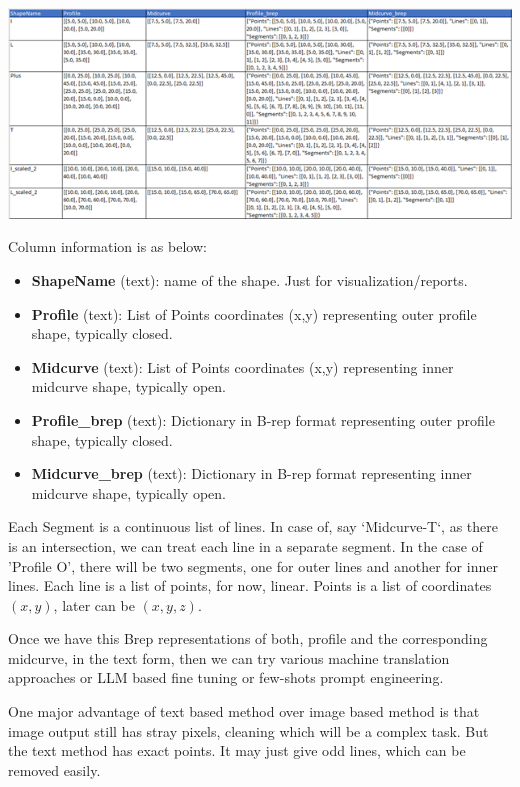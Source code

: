 \documentclass[10pt, conference]{IEEEtran}
\begin{document}
         \begin{center}
	\includegraphics[width=\linewidth]{images/shapes_csv}
	\label{fig_csv}
    \end{center}

Column information is as below:
	\begin{itemize}
	\item {\bf ShapeName} (text): name of the shape. Just for visualization/reports.
	\item {\bf Profile} (text): List of Points coordinates (x,y) representing outer profile shape, typically closed.
	\item {\bf Midcurve} (text): List of Points coordinates (x,y) representing inner midcurve shape, typically open.
	\item {\bf Profile\_brep} (text): Dictionary in B-rep format representing outer profile shape, typically closed.
	\item {\bf Midcurve\_brep} (text): Dictionary in B-rep format representing inner midcurve shape, typically open.
	\end{itemize}

Each Segment is a continuous list of lines. In case of, say `Midcurve-T`, as there is an intersection, we can treat each line in a separate segment. In the case of 'Profile O', there will be two segments, one for outer lines and another for inner lines. Each line is a list of points, for now, linear. Points is a list of coordinates $(x,y)$, later can be $(x,y,z)$.

Once we have this Brep representations of both, profile and the corresponding midcurve, in the text form, then we can try various machine translation approaches or LLM based fine tuning or few-shots prompt engineering.

One major advantage of text based method over image based method is that image output still has stray pixels, cleaning which will be a complex task. But the text method has exact points. It may just give odd lines, which can be removed easily.
\end{document}

